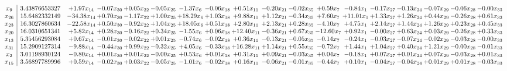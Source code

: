 \documentclass[9pt]{article}
\begin{document}
 \[\begin{array}{c| c c@{\hskip 2pt} c@{\hskip 2pt} c@{\hskip 2pt} c@{\hskip 2pt} c@{\hskip 2pt} c@{\hskip 2pt} c@{\hskip 2pt} c@{\hskip 2pt} c@{\hskip 2pt} c@{\hskip 2pt} c@{\hskip 2pt} c@{\hskip 2pt} c@{\hskip 2pt} c@{\hskip 2pt} c@{\hskip 2pt} c@{\hskip 2pt} }
 x_{9}   &  3.43876653327 & +  1.97 x_{14} & -0.07 x_{30} & +  0.05 x_{22} & -0.05 x_{25} & -1.37 x_{6} & -0.06 x_{18} & +  0.51 x_{11} & -0.20 x_{21} & -0.02 x_{35} & +  0.59 x_{7} & -0.84 x_{1} & -0.17 x_{27} & -0.13 x_{24} & -0.07 x_{29} & -0.06 x_{28} & -0.00 x_{33}\\
 x_{26}   &  15.6482332149 & -34.38 x_{14} & +  0.70 x_{30} & -1.17 x_{22} & +  1.00 x_{25} & + 18.29 x_{6} & +  1.03 x_{18} & +  9.88 x_{11} & +  1.12 x_{21} & -0.34 x_{35} & +  7.60 x_{7} & + 11.01 x_{1} & +  1.33 x_{27} & +  1.26 x_{24} & +  0.44 x_{29} & -0.26 x_{28} & +  0.61 x_{33}\\
 x_{23}   &  16.3027860634 & -22.58 x_{14} & +  0.50 x_{30} & -0.92 x_{22} & +  1.04 x_{25} & + 18.05 x_{6} & +  0.51 x_{18} & +  2.80 x_{11} & +  2.13 x_{21} & +  0.28 x_{35} & -4.10 x_{7} & +  4.75 x_{1} & +  2.14 x_{27} & +  1.44 x_{24} & +  1.26 x_{29} & +  0.23 x_{28} & +  0.45 x_{33}\\
 x_{20}   &  16.0310651341 & +  5.82 x_{14} & +  0.28 x_{30} & -0.16 x_{22} & +  0.34 x_{25} & -1.55 x_{6} & +  0.06 x_{18} & + 12.40 x_{11} & -0.36 x_{21} & +  0.67 x_{35} & -12.60 x_{7} & +  0.92 x_{1} & -0.00 x_{27} & +  0.63 x_{24} & +  0.03 x_{29} & -0.26 x_{28} & +  0.33 x_{33}\\
 x_{13}   &  5.35456293084 & +  0.67 x_{14} & -0.01 x_{30} & -0.02 x_{22} & +  0.01 x_{25} & -0.74 x_{6} & -0.02 x_{18} & +  0.36 x_{11} & -0.13 x_{21} & -0.05 x_{35} & -0.14 x_{7} & -0.24 x_{1} & -0.03 x_{27} & -0.07 x_{24} & -0.02 x_{29} & -0.03 x_{28} & -0.00 x_{33}\\
 x_{31}   &  15.2909127314 & -9.88 x_{14} & -0.44 x_{30} & +  0.99 x_{22} & -0.32 x_{25} & +  4.05 x_{6} & -0.33 x_{18} & + 16.28 x_{11} & +  1.14 x_{21} & +  0.55 x_{35} & -0.72 x_{7} & +  1.44 x_{1} & +  1.04 x_{27} & +  0.40 x_{24} & +  1.21 x_{29} & -0.00 x_{28} & -0.01 x_{33}\\
 x_{2}   &  3.01198930124 & -0.80 x_{14} & +  0.01 x_{30} & +  0.01 x_{22} & -0.00 x_{25} & +  0.53 x_{6} & +  0.01 x_{18} & +  0.31 x_{11} & +  0.09 x_{21} & -0.03 x_{35} & +  0.04 x_{7} & -0.18 x_{1} & +  0.07 x_{27} & +  0.01 x_{24} & +  0.07 x_{29} & -0.03 x_{28} & +  0.01 x_{33}\\
 x_{15}   &  3.56897789996 & +  0.59 x_{14} & -0.02 x_{30} & +  0.03 x_{22} & -0.05 x_{25} & -1.01 x_{6} & -0.02 x_{18} & +  0.16 x_{11} & -0.06 x_{21} & -0.01 x_{35} & -0.44 x_{7} & +  0.10 x_{1} & -0.04 x_{27} & -0.04 x_{24} & +  0.01 x_{29} & +  0.01 x_{28} & -0.03 x_{33}\\

\end{array}\]
\end{document}
